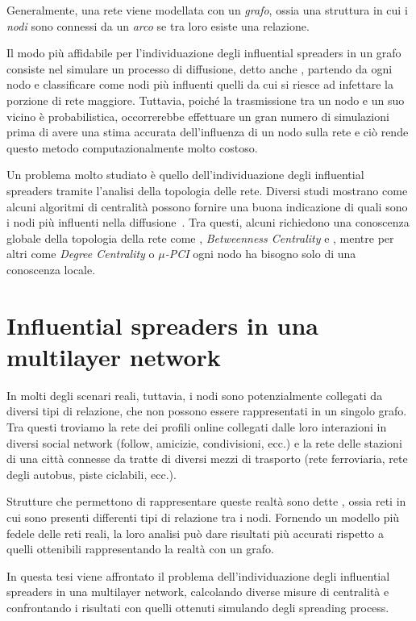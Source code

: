 Generalmente, una rete viene modellata con un \emph{grafo}, ossia una struttura in cui i 
\emph{nodi} sono connessi da un \emph{arco} se tra loro esiste una relazione.

Il modo più affidabile per l'individuazione degli influential spreaders in un grafo consiste nel 
simulare un processo di diffusione, detto anche \spproc, partendo da ogni nodo e 
classificare come nodi più 
influenti quelli da cui si riesce ad infettare la porzione di rete maggiore.
Tuttavia, poiché la trasmissione tra un nodo e un suo vicino è probabilistica,
occorrerebbe effettuare un gran numero di simulazioni prima di avere una stima accurata 
dell'influenza di un nodo sulla rete e ciò rende questo metodo computazionalmente 
molto costoso.

Un problema molto studiato è quello dell'individuazione degli influential spreaders tramite l'analisi della 
topologia delle rete.
Diversi studi mostrano come alcuni algoritmi di centralità possono fornire una buona indicazione di 
quali sono i nodi più influenti nella diffusione~\cite{basaras:infsp}\cite{kitsak:infsp}\cite{pei:infsp}.
Tra questi, alcuni richiedono una conoscenza globale della topologia della rete come
\emph{\PageRank}, \emph{Betweenness Centrality} e \emph{\kcore}, 
mentre per altri come \emph{Degree Centrality} o \emph{$\mu$-PCI} ogni nodo 
ha bisogno solo di una conoscenza locale.

\section{Influential spreaders in una multilayer network}

In molti degli scenari reali, tuttavia, i nodi sono potenzialmente collegati da diversi tipi di relazione, che non 
possono essere rappresentati in un singolo grafo. 
Tra questi troviamo la rete dei profili online collegati dalle loro interazioni
in diversi social network (follow, amicizie, condivisioni, ecc.) e la rete delle stazioni di 
una città connesse da tratte di diversi mezzi di trasporto (rete ferroviaria, rete degli autobus, 
piste ciclabili, ecc.).

Strutture che permettono di rappresentare queste realtà sono dette \muln, ossia reti in cui sono 
presenti differenti tipi di relazione tra i nodi. Fornendo un modello più fedele 
delle reti reali, la loro analisi può dare risultati più accurati rispetto 
a quelli ottenibili rappresentando la realtà con un grafo.

In questa tesi viene affrontato il problema dell'individuazione degli influential spreaders in 
una multilayer network, calcolando diverse misure di centralità e confrontando i 
risultati con quelli ottenuti simulando degli spreading process.
